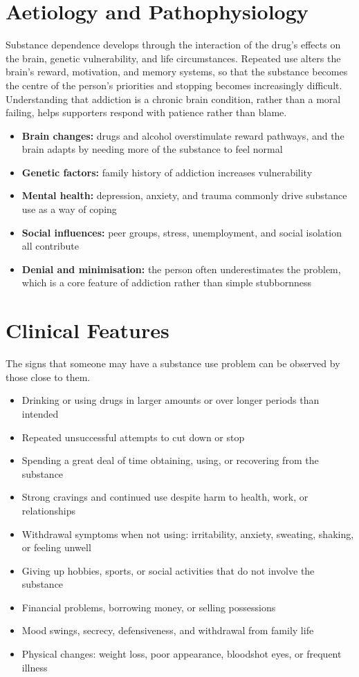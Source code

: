 \section*{Aetiology and Pathophysiology}
Substance dependence develops through the interaction of the drug's effects on the brain, genetic vulnerability, and life circumstances. Repeated use alters the brain's reward, motivation, and memory systems, so that the substance becomes the centre of the person's priorities and stopping becomes increasingly difficult. Understanding that addiction is a chronic brain condition, rather than a moral failing, helps supporters respond with patience rather than blame.
\begin{itemize}
    \item \textbf{Brain changes:} drugs and alcohol overstimulate reward pathways, and the brain adapts by needing more of the substance to feel normal
    \item \textbf{Genetic factors:} family history of addiction increases vulnerability
    \item \textbf{Mental health:} depression, anxiety, and trauma commonly drive substance use as a way of coping
    \item \textbf{Social influences:} peer groups, stress, unemployment, and social isolation all contribute
    \item \textbf{Denial and minimisation:} the person often underestimates the problem, which is a core feature of addiction rather than simple stubbornness
\end{itemize}

\section*{Clinical Features}
The signs that someone may have a substance use problem can be observed by those close to them.
\begin{itemize}
    \item Drinking or using drugs in larger amounts or over longer periods than intended
    \item Repeated unsuccessful attempts to cut down or stop
    \item Spending a great deal of time obtaining, using, or recovering from the substance
    \item Strong cravings and continued use despite harm to health, work, or relationships
    \item Withdrawal symptoms when not using: irritability, anxiety, sweating, shaking, or feeling unwell
    \item Giving up hobbies, sports, or social activities that do not involve the substance
    \item Financial problems, borrowing money, or selling possessions
    \item Mood swings, secrecy, defensiveness, and withdrawal from family life
    \item Physical changes: weight loss, poor appearance, bloodshot eyes, or frequent illness
\end{itemize}

